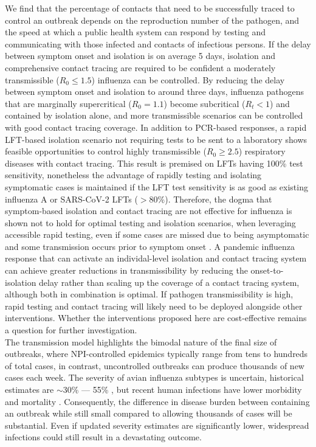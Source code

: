 \documentclass{article}
\begin{document}
We find that the percentage of contacts that need to be successfully traced to control an outbreak depends on the reproduction number of the pathogen, and the speed at which a public health system can respond by testing and communicating with those infected and contacts of infectious persons. If the delay between symptom onset and isolation is on average 5 days, isolation and comprehensive contact tracing are required to be confident a moderately transmissible ($R_0 \leq 1.5$) influenza can be controlled. By reducing the delay between symptom onset and isolation to around three days, influenza pathogens that are marginally supercritical ($R_0 = 1.1$) become subcritical ($R_t < 1$) and contained by isolation alone, and more transmissible scenarios can be controlled with good contact tracing coverage. In addition to PCR-based responses, a rapid LFT-based isolation scenario not requiring tests to be sent to a laboratory shows feasible opportunities to control highly transmissible ($R_0 \geq 2.5$) respiratory diseases with contact tracing. This result is premised on LFTs having 100\% test sensitivity, nonetheless the advantage of rapidly testing and isolating symptomatic cases is maintained if the LFT test sensitivity is as good as existing influenza A or SARS-CoV-2 LFTs ($>80$\%). Therefore, the dogma that symptom-based isolation and contact tracing are not effective for influenza is shown not to hold for optimal testing and isolation scenarios, when leveraging accessible rapid testing, even if some cases are missed due to being asymptomatic and some transmission occurs prior to symptom onset \citep{fraserFactorsThatMake2004, klinkenbergEffectivenessContactTracing2006, worldhealthorganizationPandemicInfluenzaRisk2017}. A pandemic influenza response that can activate an individal-level isolation and contact tracing system can achieve greater reductions in transmissibility by reducing the onset-to-isolation delay rather than scaling up the coverage of a contact tracing system, although both in combination is optimal. If pathogen transmissibility is high, rapid testing and contact tracing will likely need to be deployed alongside other interventions. Whether the interventions proposed here are cost-effective remains a question for further investigation. \\

The transmission model highlights the bimodal nature of the final size of outbreaks, where NPI-controlled epidemics typically range from tens to hundreds of total cases, in contrast, uncontrolled outbreaks can produce thousands of new cases each week. The severity of avian influenza subtypes is uncertain, historical estimates are $\sim$30\% --- 55\% \citep{tannerPandemicPotentialAvian2015}, but recent human infections have lower morbidity and mortality \citep{gargHighlyPathogenicAvian2025, krammerHighlyPathogenicAvian2025}. Consequently, the difference in disease burden between containing an outbreak while still small compared to allowing thousands of cases will be substantial. Even if updated severity estimates are significantly lower, widespread infections could still result in a devastating outcome. \\
\end{document}
